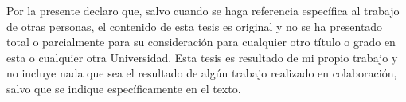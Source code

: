 
\begin{declaration}

Por la presente declaro que, salvo cuando se haga referencia específica al trabajo de otras personas, el contenido de esta tesis es original y no se ha presentado total o parcialmente para su consideración para cualquier otro título o grado en esta o cualquier otra Universidad. Esta tesis es resultado de mi propio trabajo y no incluye nada que sea el resultado de algún trabajo realizado en colaboración, salvo que se indique específicamente en el texto. 


\end{declaration}
